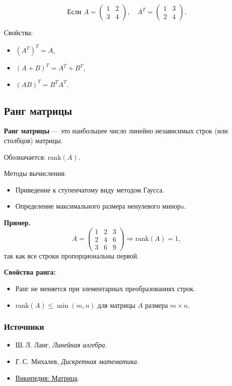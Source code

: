 \[
\text{Если } A = \begin{pmatrix}1 & 2\\3 & 4\end{pmatrix},\quad
A^T = \begin{pmatrix}1 & 3\\2 & 4\end{pmatrix}.
\]

Свойства:
\begin{itemize}[leftmargin=*]
  \item $(A^T)^T = A$,
  \item $(A + B)^T = A^T + B^T$,
  \item $(AB)^T = B^T A^T$.
\end{itemize}

\subsection{Ранг матрицы}

\textbf{Ранг матрицы} — это наибольшее число линейно независимых строк (или столбцов) матрицы.

Обозначается: $\text{rank}(A)$.

Методы вычисления:
\begin{itemize}[leftmargin=*]
  \item Приведение к ступенчатому виду методом Гаусса.
  \item Определение максимального размера ненулевого минорa.
\end{itemize}

\textbf{Пример.}
\[
A = \begin{pmatrix}
1 & 2 & 3 \\
2 & 4 & 6 \\
3 & 6 & 9
\end{pmatrix}
\Rightarrow \text{rank}(A) = 1,
\]
так как все строки пропорциональны первой.

\textbf{Свойства ранга:}
\begin{itemize}[leftmargin=*]
  \item Ранг не меняется при элементарных преобразованиях строк.
  \item $\text{rank}(A) \le \min(m, n)$ для матрицы $A$ размера $m \times n$.
\end{itemize}

\subsubsection{Источники}

\begin{itemize}
  \item Ш.\,Л. Ланг, \textit{Линейная алгебра}.
  \item Г.\,С. Михалев, \textit{Дискретная математика}.
  \item \href{https://ru.wikipedia.org/wiki/Матрица_(математика)}{Википедия: Матрица}.
\end{itemize}
